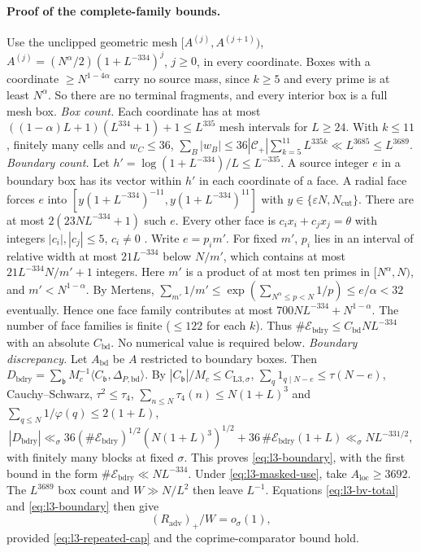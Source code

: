 \paragraph{Proof of the complete-family bounds.}
Use the unclipped geometric mesh $[A^{(j)},A^{(j+1)})$,
$A^{(j)}=(N^\alpha/2)(1+L^{-334})^j$, $j\ge0$, in every coordinate.
Boxes with a coordinate $\ge N^{1-4\alpha}$ carry no source mass, since
$k\ge5$ and every prime is at least $N^\alpha$. So there are no terminal
fragments, and every interior box is a full mesh box.
\emph{Box count.} Each coordinate has at most
$((1-\alpha)L+1)(L^{334}+1)+1\le L^{335}$ mesh intervals for $L\ge24$.
With $k\le11$, finitely many cells and $w_C\le36$,
$\sum_B|w_B|\le36|\mathcal C_+|\sum_{k=5}^{11}L^{335k}\ll L^{3685}\le L^{3689}$.
\emph{Boundary count.} Let $h'=\log(1+L^{-334})/L\le L^{-335}$.
A source integer $e$ in a boundary box has its vector within $h'$
in each coordinate of a face. A radial face forces $e$ into
$[y(1+L^{-334})^{-11},y(1+L^{-334})^{11}]$ with $y\in\{\varepsilon N,N_{\mathrm{cut}}\}$.
There are at most $2(23NL^{-334}+1)$ such $e$.
Every other face is $c_ix_i+c_jx_j=\theta$ with integers $|c_i|,|c_j|\le5$,
$c_i\ne0$ \cite[(5.29a)--(5.31) and the facet discussion after (5.40)]{PaperII}.
Write $e=p_im'$. For fixed $m'$, $p_i$ lies in an interval of relative
width at most $21L^{-334}$ below $N/m'$, which contains at most
$21L^{-334}N/m'+1$ integers. Here $m'$ is a product of at most ten primes
in $[N^\alpha,N)$, and $m'<N^{1-\alpha}$. By Mertens,
$\sum_{m'}1/m'\le\exp(\sum_{N^\alpha\le p<N}1/p)\le e/\alpha<32$ eventually.
Hence one face family contributes at most $700NL^{-334}+N^{1-\alpha}$.
The number of face families is finite ($\le122$ for each $k$). Thus
$\#\mathcal E_{\mathrm{bdry}}\le C_{\mathrm{bd}}NL^{-334}$ with an absolute
$C_{\mathrm{bd}}$. No numerical value is required below.
\emph{Boundary discrepancy.} Let $A_{\mathrm{bd}}$ be $A$ restricted to
boundary boxes. Then
$D_{\mathrm{bdry}}=\sum_{\mathfrak b}M_c^{-1}\langle C_{\mathfrak b},\Delta_{P,\mathrm{bd}}\rangle$.
By $|C_{\mathfrak b}|/M_c\le C_{\mathrm{L3},\sigma}$,
$\sum_q1_{q\mid N-e}\le\tau(N-e)$, Cauchy--Schwarz,
$\tau^2\le\tau_4$, $\sum_{n\le N}\tau_4(n)\le N(1+L)^3$ and
$\sum_{q\le N}1/\varphi(q)\le2(1+L)$,
\[
 |D_{\mathrm{bdry}}|\ll_\sigma36(\#\mathcal E_{\mathrm{bdry}})^{1/2}(N(1+L)^3)^{1/2}
             +36\,\#\mathcal E_{\mathrm{bdry}}(1+L)\ll_\sigma NL^{-331/2},
\]
with finitely many blocks at fixed $\sigma$. This proves
\eqref{eq:l3-boundary}, with the first bound in the form
$\#\mathcal E_{\mathrm{bdry}}\ll NL^{-334}$.
Under \eqref{eq:l3-masked-use}, take $A_{\mathrm{loc}}\ge3692$.
The $L^{3689}$ box count and $W\gg N/L^2$ then leave $L^{-1}$.
Equations \eqref{eq:l3-bv-total} and \eqref{eq:l3-boundary} then give
\begin{equation}\label{eq:l3-disp-total}
 (R_{\mathrm{adv}})_+/W=o_\sigma(1),
\end{equation}
provided \eqref{eq:l3-repeated-cap} and the coprime-comparator bound hold.

